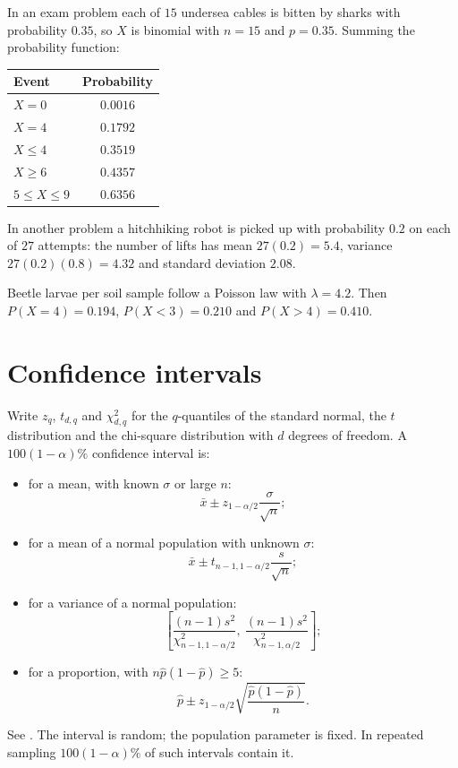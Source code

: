 \begin{example}
\label{example-binomial-cables}
In an exam problem each of $15$
undersea cables is bitten by sharks with
probability $0.35$, so $X$ is binomial
with $n = 15$ and $p = 0.35$. Summing the
probability function:
\begin{center}
\begin{tabular}{lc}
Event & Probability \\
\hline
$X = 0$ & $0.0016$ \\
$X = 4$ & $0.1792$ \\
$X \leq 4$ & $0.3519$ \\
$X \geq 6$ & $0.4357$ \\
$5 \leq X \leq 9$ & $0.6356$ \\
\end{tabular}
\end{center}
In another problem a hitchhiking robot is
picked up with probability $0.2$ on each
of $27$ attempts: the number of lifts has
mean $27(0.2) = 5.4$, variance
$27(0.2)(0.8) = 4.32$ and standard
deviation $2.08$.
\end{example}

\begin{example}
\label{example-poisson-larvae}
Beetle larvae per soil sample follow a
Poisson law with $\lambda = 4.2$. Then
$P(X = 4) = 0.194$,
$P(X < 3) = 0.210$ and
$P(X > 4) = 0.410$.
\end{example}

\section{Confidence intervals}
\label{section-confidence-intervals}

Write $z_q$, $t_{d,q}$ and $\chi^2_{d,q}$
for the $q$-quantiles of the standard
normal, the $t$ distribution and the
chi-square distribution with $d$ degrees
of freedom. A $100(1-\alpha)\%$
confidence interval is:
\begin{itemize}
\item for a mean, with known $\sigma$ or
large $n$:
$$
\bar{x} \pm z_{1-\alpha/2}
\frac{\sigma}{\sqrt{n}};
$$
\item for a mean of a normal population
with unknown $\sigma$:
$$
\bar{x} \pm t_{n-1,1-\alpha/2}
\frac{s}{\sqrt{n}};
$$
\item for a variance of a normal
population:
$$
\left[
\frac{(n-1)s^2}{\chi^2_{n-1,1-\alpha/2}},
\ \frac{(n-1)s^2}{\chi^2_{n-1,\alpha/2}}
\right];
$$
\item for a proportion, with
$n\hat{p}(1-\hat{p}) \geq 5$:
$$
\hat{p} \pm z_{1-\alpha/2}
\sqrt{\frac{\hat{p}(1-\hat{p})}{n}}.
$$
\end{itemize}
See \cite[Sections
6.5--6.8]{rosner2011biostatistics}. The
interval is random; the population
parameter is fixed. In repeated sampling
$100(1-\alpha)\%$ of such intervals
contain it.

